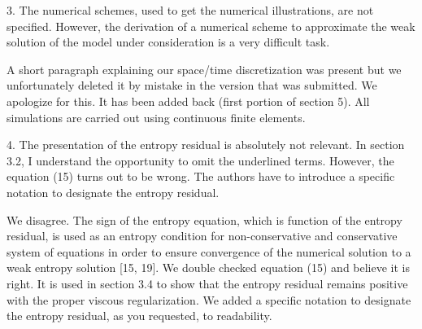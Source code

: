 \documentclass{article}
\newcommand{\tcr}[1]{\textcolor{red}{#1}}
\newcommand{\tcg}[1]{\textcolor{green}{#1}}
\begin{document}
{\color{blue}
3. The numerical schemes, used to get the numerical illustrations, are not
specified. However, the derivation of a numerical scheme to approximate
the weak solution of the model under consideration is a very difficult task.}

A short paragraph explaining our space/time discretization was present but we unfortunately deleted it by mistake
in the version that was submitted. We apologize for this. It has been added back (first portion of section 5). 
All simulations are carried out using continuous finite elements.

\bigskip


{\color{blue}
4. The presentation of the entropy residual is absolutely not relevant. In
section 3.2, I understand the opportunity to omit the underlined terms.
However, the equation (15) turns out to be wrong. The authors have to
introduce a specific notation to designate the entropy residual.}

We disagree. The sign of the entropy equation, which is function of the entropy residual, is used as an entropy condition for non-conservative and conservative system of equations in order to ensure
convergence of the numerical solution to a weak entropy solution [15, 19]. We double checked equation (15) and believe it is right. It is used in section 3.4 to show that the entropy residual remains positive with the proper
viscous regularization. We added a specific notation to designate the entropy residual, as you requested, to readability.  

\bigskip


%
\bigskip
\end{document}
